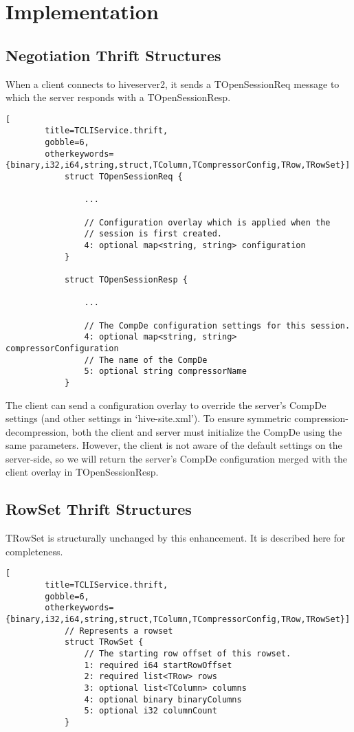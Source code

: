 \documentclass[11pt,a4paper]{article}
\begin{document}
\section{Implementation}
	
	\subsection{Negotiation Thrift Structures}
		
		When a client connects to hiveserver2, it sends a TOpenSessionReq message to which the server responds with a TOpenSessionResp.
		
		\begin{lstlisting}[
		title=TCLIService.thrift,
		gobble=6,
		otherkeywords={binary,i32,i64,string,struct,TColumn,TCompressorConfig,TRow,TRowSet}]
			struct TOpenSessionReq {
			
				...
				
				// Configuration overlay which is applied when the
				// session is first created.
				4: optional map<string, string> configuration
			}
			
			struct TOpenSessionResp {
			
				...
				
				// The CompDe configuration settings for this session.
				4: optional map<string, string> compressorConfiguration
				// The name of the CompDe
				5: optional string compressorName
			}
		\end{lstlisting}
		
		The client can send a configuration overlay to override the server's CompDe settings (and other settings in `hive-site.xml').
		To ensure symmetric compression-decompression, both the client and server must initialize the CompDe using the same parameters.
		However, the client is not aware of the default settings on the server-side, so we will return the server's CompDe configuration merged with the client overlay in TOpenSessionResp.
		
		
		
	\subsection{RowSet Thrift Structures}
	
	TRowSet is structurally unchanged by this enhancement. It is described here for completeness.
		
		\begin{lstlisting}[
		title=TCLIService.thrift,
		gobble=6,
		otherkeywords={binary,i32,i64,string,struct,TColumn,TCompressorConfig,TRow,TRowSet}]
			// Represents a rowset
			struct TRowSet {
				// The starting row offset of this rowset.
				1: required i64 startRowOffset
				2: required list<TRow> rows
				3: optional list<TColumn> columns
				4: optional binary binaryColumns
				5: optional i32 columnCount
			}
		\end{lstlisting}
		
\end{document}
